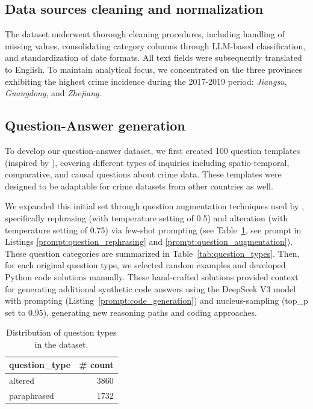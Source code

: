 \subsection{Data sources cleaning and normalization}

The dataset underwent thorough cleaning procedures, including handling of missing values, consolidating category columns through LLM-based classification, and standardization of date formats. All text fields were subsequently translated to English. To maintain analytical focus, we concentrated on the three provinces exhibiting the highest crime incidence during the 2017-2019 period: \textit{Jiangsu}, \textit{Guangdong}, and \textit{Zhejiang}.

\subsection{Question-Answer generation}

To develop our question-answer dataset, we first created 100 question templates (inspired by \citep{Dai2024QASTKG, Contractor2020QATourism}), covering different types of inquiries including spatio-temporal, comparative, and causal questions about crime data. These templates were designed to be adaptable for crime datasets from other countries as well.

We expanded this initial set through question augmentation techniques used by \cite{Yin2024MuMathCode, Li2024MuggleMath, Jain2024MetaFineTuning}, specifically rephrasing (with temperature setting of 0.5) and alteration (with temperature setting of 0.75) via few-shot prompting (see Table~\ref{tab:question_type_counts}, see prompt in Listings \ref{prompt:question_rephrasing} and \ref{prompt:question_augmentation}). These question categories are summarized in Table~\ref{tab:question_types}. Then, for each original question type, we selected random examples and developed Python code solutions manually. These hand-crafted solutions provided context for generating additional synthetic code answers using the DeepSeek V3 model with prompting (Listing~\ref{prompt:code_generation}) and nucleus-sampling \citep{Holtzman2020NucleusSampling, Ahmad2025OCRNVidia, Nvidia2024KaggleMath} (top\_p set to 0.95), generating new reasoning paths and coding approaches.


\begin{table}[H]
\centering
\begin{tabular}{lr}
\hline
\textbf{question\_type} & \textbf{\# count} \\
\hline
altered     & 3860 \\
paraphrased & 1732 \\
\hline
\end{tabular}
\caption{Distribution of question types in the dataset.}
\label{tab:question_type_counts}
\end{table}

